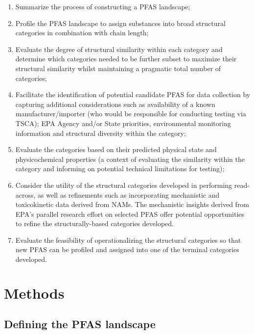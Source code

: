 \documentclass[
  super,
  preprint,
  3p]{elsarticle}
\providecommand{\tightlist}{%
  \setlength{\itemsep}{0pt}\setlength{\parskip}{0pt}}\usepackage{longtable,booktabs,array}
\begin{document}
\begin{enumerate}
\def\labelenumi{\arabic{enumi}.}
\tightlist
\item
  Summarize the process of constructing a PFAS landscape;
\item
  Profile the PFAS landscape to assign substances into broad structural
  categories in combination with chain length;
\item
  Evaluate the degree of structural similarity within each category and
  determine which categories needed to be further subset to maximize
  their structural similarity whilst maintaining a pragmatic total
  number of categories;
\item
  Facilitate the identification of potential candidate PFAS for data
  collection by capturing additional considerations such as availability
  of a known manufacturer/importer (who would be responsible for
  conducting testing via TSCA); EPA Agency and/or State priorities,
  environmental monitoring information and structural diversity within
  the category;
\item
  Evaluate the categories based on their predicted physical state and
  physicochemical properties (a context of evaluating the similarity
  within the category and informing on potential technical limitations
  for testing);
\item
  Consider the utility of the structural categories developed in
  performing read-across, as well as refinements such as incorporating
  mechanistic and toxicokinetic data derived from NAMs. The mechanistic
  insights derived from EPA's parallel research effort on selected PFAS
  offer potential opportunities to refine the structurally-based
  categories developed.
\item
  Evaluate the feasibility of operationalizing the structural categories
  so that new PFAS can be profiled and assigned into one of the terminal
  categories developed.
\end{enumerate}

\hypertarget{methods}{%
\section{Methods}\label{methods}}

\hypertarget{sec-defining-pfas}{%
\subsection{Defining the PFAS landscape}\label{sec-defining-pfas}}
\end{document}
